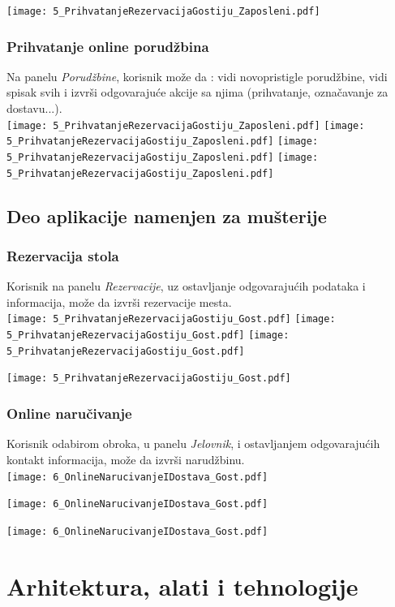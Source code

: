 \documentclass{article}
\begin{document}
\texttt{[image: 5\_PrihvatanjeRezervacijaGostiju\_Zaposleni.pdf]}
   

\subsubsection{Prihvatanje online porudžbina}
Na panelu \emph{Porudžbine}, korisnik može da : vidi novopristigle porudžbine, vidi spisak svih i izvrši odgovarajuće akcije sa njima (prihvatanje, označavanje za dostavu...).\\
\texttt{[image: 5\_PrihvatanjeRezervacijaGostiju\_Zaposleni.pdf]}
\vfill
\texttt{[image: 5\_PrihvatanjeRezervacijaGostiju\_Zaposleni.pdf]}
\vfill
\texttt{[image: 5\_PrihvatanjeRezervacijaGostiju\_Zaposleni.pdf]}
\texttt{[image: 5\_PrihvatanjeRezervacijaGostiju\_Zaposleni.pdf]}

\subsection{Deo aplikacije namenjen za mušterije}

\subsubsection{Rezervacija stola}
Korisnik na panelu \emph{Rezervacije}, uz ostavljanje odgovarajućih podataka i informacija, može da izvrši rezervacije mesta.\\

\texttt{[image: 5\_PrihvatanjeRezervacijaGostiju\_Gost.pdf]}
\vfill
\texttt{[image: 5\_PrihvatanjeRezervacijaGostiju\_Gost.pdf]}
\texttt{[image: 5\_PrihvatanjeRezervacijaGostiju\_Gost.pdf]}

\texttt{[image: 5\_PrihvatanjeRezervacijaGostiju\_Gost.pdf]}

\subsubsection{Online naručivanje}
Korisnik odabirom obroka, u panelu \emph{Jelovnik}, i ostavljanjem odgovarajućih kontakt informacija, može da izvrši narudžbinu.\\

\texttt{[image: 6\_OnlineNarucivanjeIDostava\_Gost.pdf]}

\texttt{[image: 6\_OnlineNarucivanjeIDostava\_Gost.pdf]}

\texttt{[image: 6\_OnlineNarucivanjeIDostava\_Gost.pdf]}
\pagebreak
\section{Arhitektura, alati i tehnologije}
\end{document}
